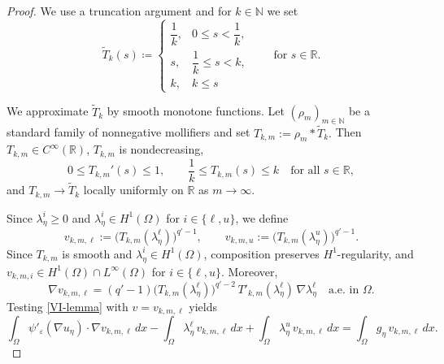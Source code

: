 \documentclass[11pt]{article}
\theoremstyle{definition}
\theoremstyle{remark}
\begin{document}
\begin{proof}
We use a truncation argument and for $k\in\mathbb{N}$ we set
\[
\tilde{T}_k(s) \coloneqq
\begin{cases}
\dfrac{1}{k}, & 0 \le s < \dfrac{1}{k}, \\[4pt]
s, & \dfrac{1}{k} \le s < k, \\[4pt]
k, & k \le s
\end{cases}
\qquad \text{for }s\in\mathbb{R}.
\]

We approximate $\tilde T_k$ by smooth monotone functions. Let $(\rho_m)_{m\in\mathbb N}$ be a standard family of nonnegative mollifiers and set
$
T_{k,m}:=\rho_m * \tilde T_k.$
Then $T_{k,m}\in C^\infty(\mathbb R)$, $T_{k,m}$ is nondecreasing,
\[
0\le T_{k,m}' (s)\le 1,
\qquad
\frac1k\le T_{k,m}(s)\le k
\quad\text{for all } s\in\mathbb R,
\]
and $T_{k,m}\to \tilde T_k$ locally uniformly on $\mathbb R$ as $m\to\infty$.

Since $\lambda_\eta^i\ge 0$ and $\lambda_\eta^i\in H^1(\Omega)$ for $i\in\{\ell,u\}$, we define
\[
v_{k,m,\ell}:=\bigl(T_{k,m}(\lambda^\ell_\eta)\bigr)^{q'-1},
\qquad
v_{k,m,u}:=\bigl(T_{k,m}(\lambda^u_\eta)\bigr)^{q'-1}.
\]
Since $T_{k,m} $ is smooth and $\lambda_\eta^i\in H^1(\Omega)$, composition preserves $H^1$-regularity, and $
v_{k,m,i}\in H^1(\Omega)\cap L^\infty(\Omega)
$ for $i\in\{\ell,u\}.$
Moreover,
\[
\nabla v_{k,m,\ell}
=(q'-1)\bigl(T_{k,m}(\lambda^\ell_\eta)\bigr)^{q'-2}
\,T'_{k,m}(\lambda^\ell_\eta)\,\nabla\lambda^\ell_\eta
\quad\text{a.e.\ in }\Omega.
\]
Testing \eqref{VI-lemma} with $v=v_{k,m,\ell}$ yields
\begin{equation}\label{eq:test-vk}
\int_\Omega \psi'_\varepsilon(\nabla u_\eta)\cdot\nabla v_{k,m,\ell}\,dx
-\int_\Omega \lambda^\ell_\eta\,v_{k,m,\ell}\,dx
+\int_\Omega \lambda^u_\eta\,v_{k,m,\ell}\,dx
=
\int_\Omega g_\eta\,v_{k,m,\ell}\,dx.
\end{equation}


\end{proof}
\end{document}
